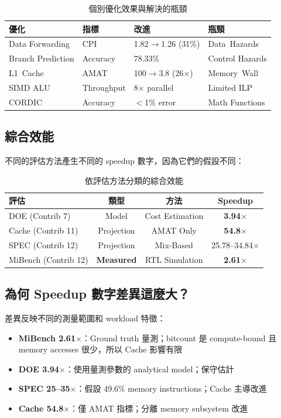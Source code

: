 \documentclass[journal]{IEEEtran}
\begin{document}
\begin{table}[!t]
\centering
\caption{個別優化效果與解決的瓶頸}
\footnotesize
\begin{tabular}{@{}llll@{}}
\toprule
\textbf{優化} & \textbf{指標} & \textbf{改進} & \textbf{瓶頸} \\
\midrule
Data Forwarding & CPI & 1.82$\rightarrow$1.26 (31\%) & Data~Hazards \\
Branch Prediction & Accuracy & 78.33\% & Control Hazards \\
L1~Cache & AMAT & 100$\rightarrow$3.8 (26$\times$) & Memory~Wall \\
SIMD ALU & Throughput & 8$\times$ parallel & Limited ILP \\
CORDIC & Accuracy & $<$1\% error & Math Functions \\
\bottomrule
\end{tabular}
\end{table}

\subsection{綜合效能}
不同的評估方法產生不同的 speedup 數字，因為它們的假設不同：

\begin{table}[!t]
\centering
\caption{依評估方法分類的綜合效能}
\footnotesize
\begin{tabular}{@{}lccc@{}}
\toprule
\textbf{評估} & \textbf{類型} & \textbf{方法} & \textbf{Speedup} \\
\midrule
DOE (Contrib 7) & Model & Cost Estimation & \textbf{3.94$\times$} \\
Cache (Contrib 11) & Projection & AMAT Only & \textbf{54.8$\times$} \\
SPEC (Contrib 12) & Projection & Mix-Based & 25.78--34.84$\times$ \\
MiBench (Contrib 12) & \textbf{Measured} & RTL Simulation & \textbf{2.61$\times$} \\
\bottomrule
\end{tabular}
\end{table}

\subsection{為何 Speedup 數字差異這麼大？}
差異反映不同的測量範圍和 workload 特徵：
\begin{itemize}
    \item \textbf{MiBench 2.61$\times$}：Ground truth 量測；bitcount 是 compute-bound 且 memory accesses 很少，所以 Cache 影響有限
    \item \textbf{DOE 3.94$\times$}：使用量測參數的 analytical model；保守估計
    \item \textbf{SPEC 25--35$\times$}：假設 49.6\% memory instructions；Cache 主導改進
    \item \textbf{Cache 54.8$\times$}：僅 AMAT 指標；分離 memory subsystem 改進
\end{itemize}
\end{document}
